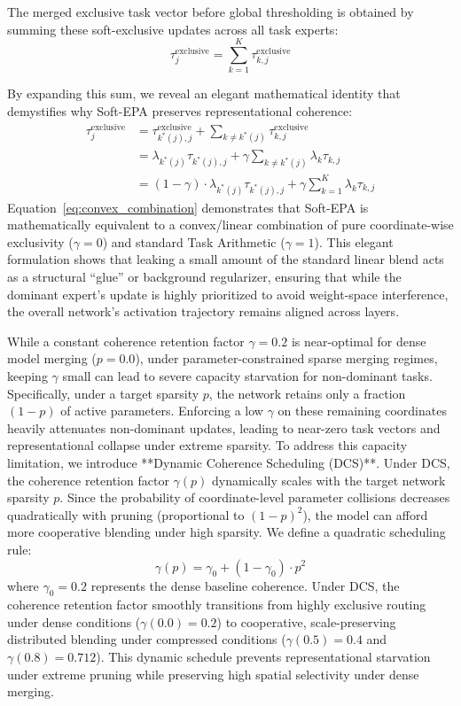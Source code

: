 The merged exclusive task vector before global thresholding is obtained by summing these soft-exclusive updates across all task experts:
\begin{equation}
\label{eq:merged_exclusive_vector}
\tau^{\text{exclusive}}_j = \sum_{k=1}^K \tau^{\text{exclusive}}_{k, j}
\end{equation}

By expanding this sum, we reveal an elegant mathematical identity that demystifies why Soft-EPA preserves representational coherence:
\begin{align}
\label{eq:convex_combination}
\tau^{\text{exclusive}}_j &= \tau^{\text{exclusive}}_{k^*(j), j} + \sum_{k \neq k^*(j)} \tau^{\text{exclusive}}_{k, j} \nonumber \\
&= \lambda_{k^*(j)} \tau_{k^*(j), j} + \gamma \sum_{k \neq k^*(j)} \lambda_k \tau_{k, j} \nonumber \\
&= (1 - \gamma) \cdot \lambda_{k^*(j)} \tau_{k^*(j), j} + \gamma \sum_{k=1}^K \lambda_k \tau_{k, j}
\end{align}
Equation~\ref{eq:convex_combination} demonstrates that Soft-EPA is mathematically equivalent to a convex/linear combination of pure coordinate-wise exclusivity ($\gamma = 0$) and standard Task Arithmetic ($\gamma = 1$). This elegant formulation shows that leaking a small amount of the standard linear blend acts as a structural ``glue'' or background regularizer, ensuring that while the dominant expert's update is highly prioritized to avoid weight-space interference, the overall network's activation trajectory remains aligned across layers.

While a constant coherence retention factor $\gamma = 0.2$ is near-optimal for dense model merging ($p=0.0$), under parameter-constrained sparse merging regimes, keeping $\gamma$ small can lead to severe capacity starvation for non-dominant tasks. Specifically, under a target sparsity $p$, the network retains only a fraction $(1-p)$ of active parameters. Enforcing a low $\gamma$ on these remaining coordinates heavily attenuates non-dominant updates, leading to near-zero task vectors and representational collapse under extreme sparsity. To address this capacity limitation, we introduce **Dynamic Coherence Scheduling (DCS)**. Under DCS, the coherence retention factor $\gamma(p)$ dynamically scales with the target network sparsity $p$. Since the probability of coordinate-level parameter collisions decreases quadratically with pruning (proportional to $(1-p)^2$), the model can afford more cooperative blending under high sparsity. We define a quadratic scheduling rule:
\begin{equation}
\label{eq:dynamic_coherence_scheduling}
\gamma(p) = \gamma_0 + (1 - \gamma_0) \cdot p^2
\end{equation}
where $\gamma_0 = 0.2$ represents the dense baseline coherence. Under DCS, the coherence retention factor smoothly transitions from highly exclusive routing under dense conditions ($\gamma(0.0) = 0.2$) to cooperative, scale-preserving distributed blending under compressed conditions ($\gamma(0.5) = 0.4$ and $\gamma(0.8) = 0.712$). This dynamic schedule prevents representational starvation under extreme pruning while preserving high spatial selectivity under dense merging.

